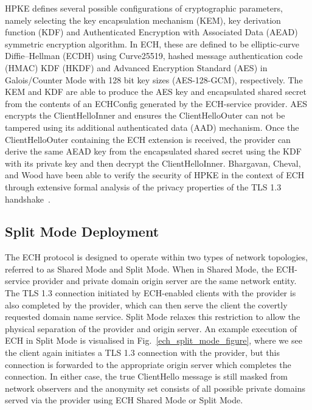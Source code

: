 HPKE defines several possible configurations of cryptographic parameters, namely selecting the key encapsulation mechanism (KEM), key derivation function (KDF) and Authenticated Encryption with Associated Data (AEAD) symmetric encryption algorithm. In ECH, these are defined to be elliptic-curve Diffie–Hellman (ECDH) using Curve25519, hashed message authentication code (HMAC) KDF (HKDF) and Advanced Encryption Standard (AES) in Galois/Counter Mode with 128 bit key sizes (AES-128-GCM), respectively. The KEM and KDF are able to produce the AES key and encapsulated shared secret from the contents of an ECHConfig generated by the ECH-service provider. AES encrypts the ClientHelloInner and ensures the ClientHelloOuter can not be tampered using its additional authenticated data (AAD) mechanism. Once the ClientHelloOuter containing the ECH extension is received, the provider can derive the same AEAD key from the encapsulated shared secret using the KDF with its private key and then decrypt the ClientHelloInner. Bhargavan, Cheval, and Wood have been able to verify the security of HPKE in the context of ECH through extensive formal analysis of the privacy properties of the TLS 1.3 handshake~\cite{bhargavan2022symbolic}.

\subsection{Split Mode Deployment}

The ECH protocol is designed to operate within two types of network topologies, referred to as Shared Mode and Split Mode. When in Shared Mode, the ECH-service provider and private domain origin server are the same network entity. The TLS 1.3 connection initiated by ECH-enabled clients with the provider is also completed by the provider, which can then serve the client the covertly requested domain name service. Split Mode relaxes this restriction to allow the physical separation of the provider and origin server. An example execution of ECH in Split Mode is visualised in Fig.~\ref{ech_split_mode_figure}, where we see the client again initiates a TLS 1.3 connection with the provider, but this connection is forwarded to the appropriate origin server which completes the connection. In either case, the true ClientHello message is still masked from network observers and the anonymity set consists of all possible private domains served via the provider using ECH Shared Mode or Split Mode.

